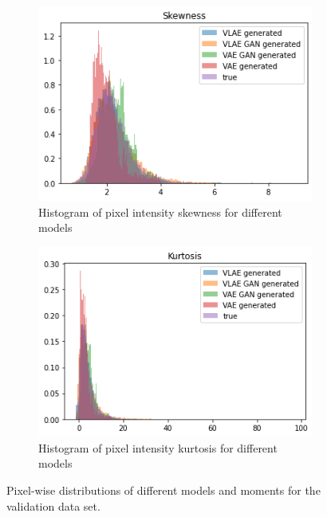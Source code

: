 \begin{figure}
\begin{subfigure}{0.4\textwidth}
        \centering
        \includegraphics[width=\textwidth]{images/generated_vs_true/mnist_vs_models_skew.png}
        \caption{Histogram of pixel intensity skewness for different models}
        \label{subfig:skew_generated_vs_true}
    \end{subfigure}
    \hfill
    \begin{subfigure}{0.4\textwidth}
        \centering
        \includegraphics[width=\textwidth]{images/generated_vs_true/mnist_vs_models_kurt.png}
        \caption{Histogram of pixel intensity kurtosis for different models}
        \label{subfig:kurt_generated_vs_true}
    \end{subfigure}
    \caption[Models on \textsc{Mnist}: Pixel-wise distributions]{Pixel-wise distributions of different models and moments for the validation data set.}
    \label{fig:mean_generated_vs_true}
\end{figure}

